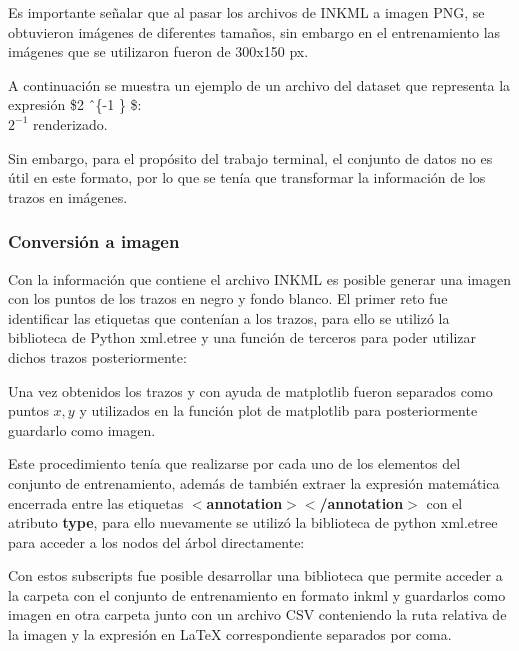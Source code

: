 Es importante señalar que al pasar los archivos de INKML a imagen PNG, se obtuvieron imágenes de diferentes tamaños, sin embargo en el entrenamiento las imágenes que se utilizaron fueron de 300x150 px.

A continuación se muestra un ejemplo de un archivo del dataset que representa la expresión \$2 \^\ \{-1 \} \$:\\
 $2^{-1}$ renderizado.

Sin embargo, para el propósito del trabajo terminal, el conjunto de datos no es útil en este formato, por lo que se tenía que transformar la información de los trazos en imágenes.
\subsubsection{Conversión a imagen}
Con la información que contiene el archivo INKML es posible generar una imagen con los puntos de los trazos en negro y fondo blanco. El primer reto fue identificar las etiquetas que contenían a los trazos, para ello se utilizó la biblioteca de Python xml.etree y una función de terceros para poder utilizar dichos trazos posteriormente:



Una vez obtenidos los trazos y con ayuda de matplotlib fueron separados como puntos $x,y$ y utilizados en la función plot de matplotlib para posteriormente guardarlo como imagen.



Este procedimiento tenía que realizarse por cada uno de los elementos del conjunto de entrenamiento, además de también extraer la expresión matemática encerrada entre las etiquetas \textbf{$<$annotation$>$$<$/annotation$>$} con el atributo \textbf{type}, para ello nuevamente se utilizó la biblioteca de python xml.etree para acceder a los nodos del árbol directamente:

Con estos subscripts fue posible desarrollar una biblioteca que permite acceder a la carpeta con el conjunto de entrenamiento en formato inkml y guardarlos como imagen en otra carpeta junto con un archivo CSV conteniendo la ruta relativa de la imagen y la expresión en \LaTeX{} correspondiente separados por coma.


